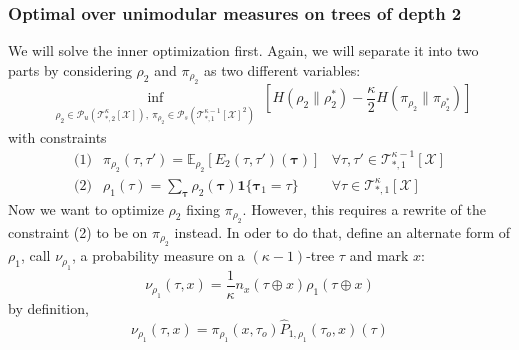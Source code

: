 \documentclass[12pt]{article}
\newcommand{\TB}{{ \boldsymbol\tau}}
\newcommand{\X}{{\mathcal{X}}}
\newcommand{\PP}{{\mathcal{P}}}
\newcommand{\TT}{{\mathcal{T}}}
\newcommand{\EE}{{\mathbb{E}}}
\newcommand{\one}[1]{\mathbf{1}\{#1\}}
\newcommand{\tree}[2]{\TT_{*, #1}^{#2}[\X]}
\newcommand{\mSl}{\PP_u(\TT_{*, 2}^{\kappa}[\X])}
\newcommand{\mEl}{\PP_s(\TT_{*, 1}^{\kappa-1}[\X]^2)}
\newcommand{\cnt}[1]{{n_{#1}}}
\newcommand{\Sl}{{\rho_2}}
\newcommand{\Slo}{{\rho_2^*}}
\newcommand{\El}{{\pi_\Sl}}
\newcommand{\Elo}{{\pi_\Slo}}
\newcommand{\Ss}{{\rho_1}}
\newcommand{\Sm}{{\nu_{\Ss}}}
\newcommand{\Es}{{\pi_\Ss}}
\newcommand{\UE}{\widehat{P}_{1, \Ss}}
\numberwithin{equation}{section}
\begin{document}
\subsubsection*{Optimal over unimodular measures on trees of depth 2}
We will solve the inner optimization first. Again, we will separate it into two parts by considering $\Sl$ and $\El$ as two different variables:
\begin{equation*}
    \inf_{\substack{\Sl\in\mSl,\ \El\in\mEl}}\left[H(\Sl\|\Slo) - \frac\kappa2 H(\El\|\Elo)\right]
\end{equation*}
with constraints
\begin{align*}
    \text{(1)} & \El(\tau, \tau') = \EE_\Sl[E_2(\tau,\tau')(\TB)] & \forall \tau, \tau'\in\tree{1}{\kappa-1} \\
    \text{(2)} & \Ss(\tau) = \sum_{\TB}\Sl(\TB)\one{\TB_1=\tau}   & \forall\tau\in\tree{1}{\kappa}
\end{align*}
Now we want to optimize $\Sl$ fixing $\El$. However, this requires a rewrite of the constraint (2)
to be on $\El$ instead. In oder to do that, define an alternate form of $\Ss$, call $\Sm$, a probability measure on a $(\kappa-1)$-tree $\tau$ and mark $x$:
\begin{equation}
    \Sm(\tau, x) = \frac1\kappa \cnt{x}(\tau\oplus x) \Ss(\tau\oplus x)
\end{equation}
by definition,
\begin{equation}
    \Sm(\tau, x) = \Es(x, \tau_o)\UE(\tau_o, x)(\tau)
\end{equation}
\end{document}
